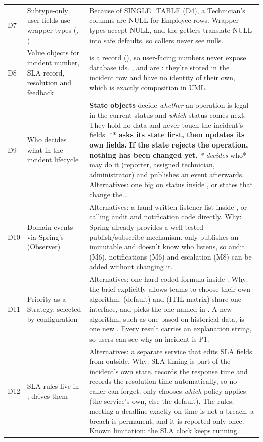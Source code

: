 \begin{longtable}{@{}L{0.9cm}L{4.3cm}L{10cm}@{}}
D7 & Subtype-only user fields use wrapper types (, ) & Because of SINGLE\_TABLE (D4), a Technician's columns are NULL for Employee rows. Wrapper types accept NULL, and the getters translate NULL into safe defaults, so callers never see nulls. \\
D8 & Value objects for incident number, SLA record, resolution and feedback &  is a record (), so user-facing numbers never expose database ids. ,  and  are : they're stored in the incident row and have no identity of their own, which is exactly composition in UML. \\
D9 & Who decides what in the incident lifecycle & \textbf{State objects} decide \textit{whether} an operation is legal in the current status and \textit{which} status comes next. They hold no data and never touch the incident's fields. **\textbf{ asks its state first, then updates its own fields. If the state rejects the operation, nothing has been changed yet. }\textit{* decides }who* may do it (reporter, assigned technician, administrator) and publishes an event afterwards. Alternatives: one big  on status inside , or states that change the... \\
D10 & Domain events via Spring's  (Observer) & Alternatives: a hand-written listener list inside , or calling audit and notification code directly. Why: Spring already provides a well-tested publish/subscribe mechanism.  only publishes an immutable  and doesn't know who listens, so audit (M6), notifications (M6) and escalation (M8) can be added without changing it. \\
D11 & Priority as a Strategy, selected by configuration & Alternatives: one hard-coded formula inside . Why: the brief explicitly allows teams to choose their own algorithm.  (default) and  (ITIL matrix) share one interface, and  picks the one named in . A new algorithm, such as one based on historical data, is one new . Every result carries an explanation string, so users can see why an incident is P1. \\
D12 & SLA rules live in ;  drives them & Alternatives: a separate service that edits SLA fields from outside. Why: SLA timing is part of the incident's own state.  records the response time and  records the resolution time automatically, so no caller can forget.  only chooses \textit{which} policy applies (the service's own, else the default). The rules: meeting a deadline exactly on time is not a breach, a breach is permanent, and it is reported only once. Known limitation: the SLA clock keeps running... \\

\end{longtable}
